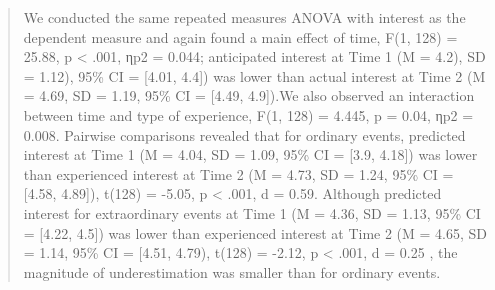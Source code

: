 \documentclass[]{book}
\newenvironment{Shaded}{\begin{snugshade}}{\end{snugshade}}
\newcommand{\ControlFlowTok}[1]{\textcolor[rgb]{0.13,0.29,0.53}{\textbf{#1}}}
\newcommand{\DataTypeTok}[1]{\textcolor[rgb]{0.13,0.29,0.53}{#1}}
\newcommand{\DecValTok}[1]{\textcolor[rgb]{0.00,0.00,0.81}{#1}}
\newcommand{\ErrorTok}[1]{\textcolor[rgb]{0.64,0.00,0.00}{\textbf{#1}}}
\newcommand{\FloatTok}[1]{\textcolor[rgb]{0.00,0.00,0.81}{#1}}
\newcommand{\KeywordTok}[1]{\textcolor[rgb]{0.13,0.29,0.53}{\textbf{#1}}}
\newcommand{\NormalTok}[1]{#1}
\newcommand{\OperatorTok}[1]{\textcolor[rgb]{0.81,0.36,0.00}{\textbf{#1}}}
\newcommand{\StringTok}[1]{\textcolor[rgb]{0.31,0.60,0.02}{#1}}
\begin{document}
\begin{Shaded}
\begin{Highlighting}[]
contrasts_factorial$statistic[2]%
\end{Highlighting}
\end{Shaded}

\begin{quote}
We conducted the same repeated measures ANOVA with interest as the dependent measure and again found a main effect of time, F(1, 128) = 25.88, p \textless{} .001, ηp2 = 0.044; anticipated interest at Time 1 (M = 4.2), SD = 1.12), 95\% CI = {[}4.01, 4.4{]}) was lower than actual interest at Time 2 (M = 4.69, SD = 1.19, 95\% CI = {[}4.49, 4.9{]}).We also observed an interaction between time and type of experience, F(1, 128) = 4.445, p = 0.04, ηp2 = 0.008. Pairwise comparisons revealed that for ordinary events, predicted interest at Time 1 (M = 4.04, SD = 1.09, 95\% CI = {[}3.9, 4.18{]}) was lower than experienced interest at Time 2 (M = 4.73, SD = 1.24, 95\% CI = {[}4.58, 4.89{]}), t(128) = -5.05, p \textless{} .001, d = 0.59. Although predicted interest for extraordinary events at Time 1 (M = 4.36, SD = 1.13, 95\% CI = {[}4.22, 4.5{]}) was lower than experienced interest at Time 2 (M = 4.65, SD = 1.14, 95\% CI = {[}4.51, 4.79), t(128) = -2.12, p \textless{} .001, d = 0.25 , the magnitude of underestimation was smaller than for ordinary events.
\end{quote}
\end{document}
